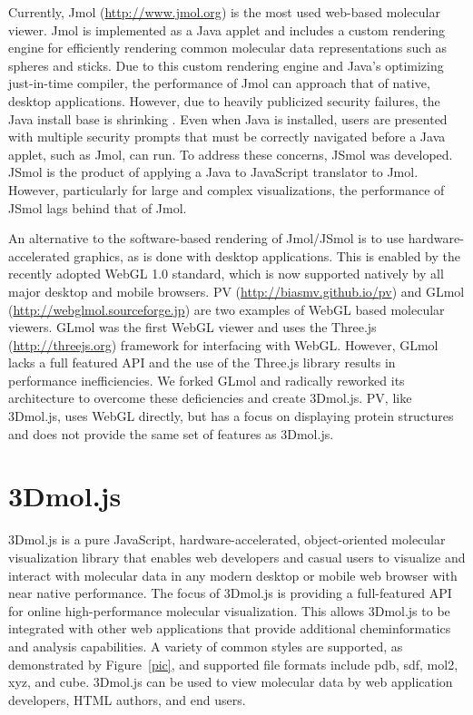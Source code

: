 \documentclass[]{bioinfo}
\begin{document}
Currently, Jmol \citep{hanson2010jmol} (\url{http://www.jmol.org}) is the most used web-based molecular viewer. Jmol is implemented as a Java applet and includes a custom rendering engine for efficiently rendering common molecular data representations such as spheres and sticks.  Due to this custom rendering engine and Java's optimizing just-in-time compiler, the performance of Jmol can approach that of native, desktop applications.  However, due to heavily publicized security failures, the Java install base is shrinking \citep{doomedjava}.  Even when Java is installed, users are presented with multiple security prompts that must be correctly navigated before a Java applet, such as Jmol, can run.
To address these concerns, JSmol \citep{hanson2013jsmol} was developed. JSmol is the product of applying a Java to JavaScript translator to Jmol. 
However, particularly for large and complex visualizations, the performance of JSmol lags behind that of Jmol.

An alternative to the software-based rendering of Jmol/JSmol is to use hardware-accelerated graphics, as is done with desktop applications.  This is enabled by the recently adopted WebGL 1.0 standard, which is now supported natively by all major desktop and mobile browsers. PV (\url{http://biasmv.github.io/pv}) and GLmol (\url{http://webglmol.sourceforge.jp}) are two examples of WebGL based molecular viewers. GLmol was the first WebGL viewer and uses the Three.js (\url{http://threejs.org}) framework for interfacing with WebGL.  However, GLmol lacks a full featured API and the use of the Three.js library results in performance inefficiencies. We forked GLmol and radically reworked its architecture to overcome these deficiencies and create 3Dmol.js.  PV, like 3Dmol.js, uses WebGL directly, but has a focus on displaying protein structures and does not provide the same set of features as 3Dmol.js.

\vspace{-10pt}
\section{3Dmol.js}

3Dmol.js is a pure JavaScript, hardware-accelerated, object-oriented molecular visualization library that enables web developers and casual users to visualize and interact with molecular data in any modern desktop or mobile web browser with near native performance.  The focus of 3Dmol.js is providing a full-featured API for online high-performance molecular visualization. This allows 3Dmol.js to be integrated with other web applications that provide additional cheminformatics and analysis capabilities.
A variety of common styles are supported, as demonstrated by Figure~\ref{pic}, and supported file formats include pdb, sdf, mol2, xyz, and cube.
3Dmol.js can be used to view molecular data by web application developers, HTML authors, and end users.  
\end{document}
